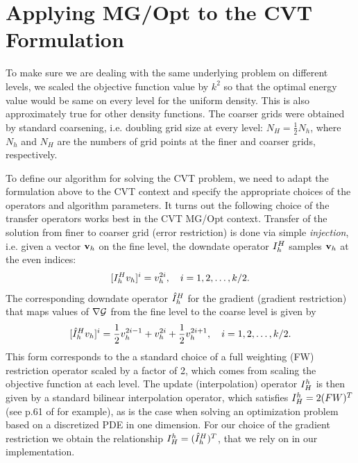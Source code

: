 \documentclass{siamltex}
\begin{document}
\section{Applying MG/Opt to the CVT Formulation}

To make sure we are dealing with the same underlying problem on different levels, we scaled the objective function value by $k^{2}$ so that the optimal energy value would be same on every level for the uniform density. This  is also approximately true for other density functions.  The coarser grids were obtained by standard coarsening, i.e. doubling grid size at every level:  $N_H= \frac{1}{2}N_h$, where $N_h$ and $N_H$ are the numbers of grid points at the finer and coarser grids, respectively.

To define our algorithm for solving the CVT problem, we need to adapt the formulation above to the CVT context and specify the appropriate choices of the operators and algorithm parameters. It turns out the following choice of the transfer operators works best in the CVT MG/Opt context. Transfer of the solution from finer to coarser grid (error restriction) is done via simple {\em injection}, i.e. given a vector ${\bf v}_h$ on the fine level, the downdate operator $I_h^H$ samples ${\bf v}_h$ at the even indices:
$$
[I_h^H v_h]^{i}=v_h^{2i},\quad i=1,2,\ldots,k/2.
$$
The corresponding downdate operator ${\hat I}_h^H$ for the gradient (gradient restriction) that maps values of $\nabla \cg$ from the fine level to the coarse level is given by
$$
[{\hat I}_h^H v_h]^{i}=\frac{1}{2} v_h^{2i-1}+ v_h^{2i}+\frac{1}{2} v_h^{2i+1}, \quad i=1,2,\ldots,k/2.
$$
This form corresponds to the a standard choice of a full weighting (FW) restriction operator scaled by a factor of 2, which comes from scaling the objective function at each level. The update (interpolation) operator $I_H^h$ is then given by a standard bilinear interpolation operator, which satisfies $I_H^h =2(FW)^T$ (see p.61 of \cite{trotten} for example), as is the case when solving an optimization problem based on a discretized PDE in one dimension. For our choice of the gradient restriction we obtain the relationship $I_H^h=({\hat I}_h^H) ^T$, that we rely on in our implementation.

\end{document}
